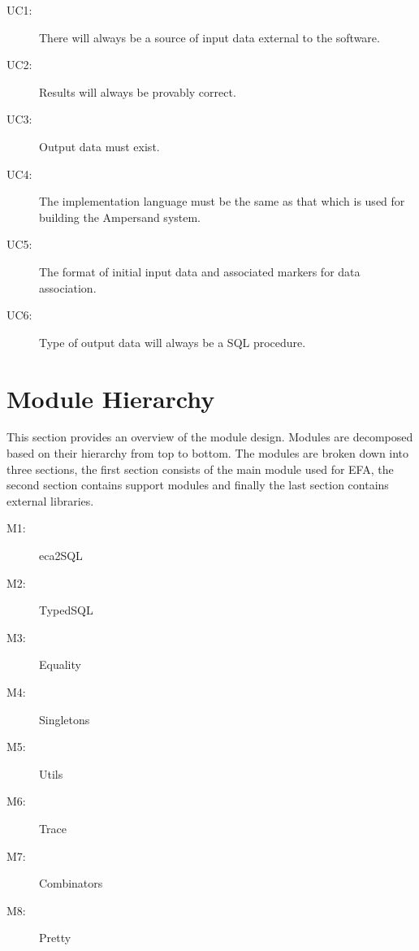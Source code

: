 \documentclass[12pt, svgnames]{article}
\begin{document}
\begin{description}
    \item[UC1:] There will always be a source of input data external to the 
    software.
    \item[UC2:] Results will always be provably correct.
    \item[UC3:] Output data must exist.
    \item[UC4:] The implementation language must be the same as that which is 
    used for building the Ampersand system.
    \item[UC5:] The format of initial input data and associated markers for 
    data association.
    \item[UC6:] Type of output data will always be a SQL procedure.
\end{description}

\section{Module Hierarchy}
This section provides an overview of the module design. Modules are decomposed 
based on their hierarchy from top to bottom. The modules are broken down into 
three sections, the first section consists of the main module used for EFA, 
the second section contains support modules and finally the last section
contains external libraries.

\begin{description}
    \item[M1:] eca2SQL
    \item[M2:] TypedSQL
    \item[M3:] Equality
    \item[M4:] Singletons
    \item[M5:] Utils
    \item[M6:] Trace
    \item[M7:] Combinators
    \item[M8:] Pretty
\end{description}
\end{document}
